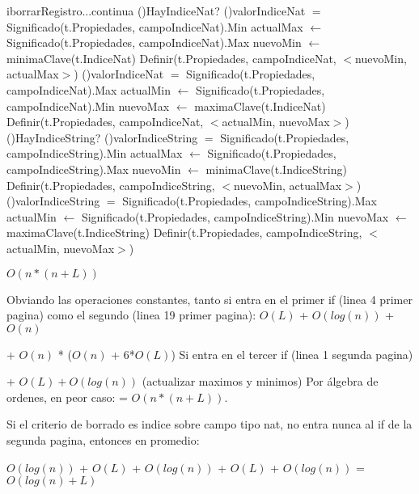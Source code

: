 \begin{Algoritmos}
\begin{algoritmo}{iborrarRegistro}{...continua}{}
\If(){HayIndiceNat?}{
	\If(){valorIndiceNat $=$ Significado(t.Propiedades, campoIndiceNat).Min}{
    	actualMax $\gets$ Significado(t.Propiedades, campoIndiceNat).Max 
        nuevoMin $\gets$ minimaClave(t.IndiceNat) 
		Definir(t.Propiedades, campoIndiceNat, $<$nuevoMin, actualMax$>$) 
	}
	\If(){valorIndiceNat $=$ Significado(t.Propiedades, campoIndiceNat).Max}{
    	actualMin $\gets$ Significado(t.Propiedades, campoIndiceNat).Min 
        nuevoMax $\gets$ maximaClave(t.IndiceNat) 
		Definir(t.Propiedades, campoIndiceNat, $<$actualMin, nuevoMax$>$) 
	}
}
\If(){HayIndiceString?}{
	\If(){valorIndiceString $=$ Significado(t.Propiedades, campoIndiceString).Min}{
    	actualMax $\gets$ Significado(t.Propiedades, campoIndiceString).Max 
        nuevoMin $\gets$ minimaClave(t.IndiceString) 
		Definir(t.Propiedades, campoIndiceString, $<$nuevoMin, actualMax$>$) 
	}
	\If(){valorIndiceString $=$ Significado(t.Propiedades, campoIndiceString).Max}{
    	actualMin $\gets$ Significado(t.Propiedades, campoIndiceString).Min 
        nuevoMax $\gets$ maximaClave(t.IndiceString) 
		Definir(t.Propiedades, campoIndiceString, $<$actualMin, nuevoMax$>$) 
	}
}
\end{algoritmo}
  \datosAlgoritmo{} %
  {} %
  {} %
  {$O(n*(n+L))$} %
  {Obviando las operaciones constantes, tanto si entra en el primer if (linea 4 primer pagina) como el segundo (linea 19 primer pagina): $O(L)$ + $O(log(n))$ + $O(n)$
  
  + $O(n)$ * ($O(n)$ + 6*$O(L)$) Si entra en el tercer if (linea 1 segunda pagina)
  
  + $O(L) + O(log(n))$ (actualizar maximos y minimos)
  Por \'algebra de ordenes, en peor caso: = $O(n*(n+L))$.

Si el criterio de borrado es indice sobre campo tipo nat, no entra nunca al if de la segunda pagina, entonces en promedio:

$O(log(n))$ + $O(L)$ + $O(log(n))$ + $O(L)$ + $O(log(n))$ = $O(log(n) + L)$
} %
  

\end{Algoritmos}

